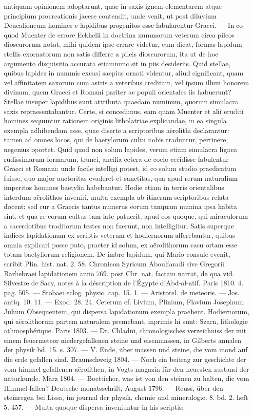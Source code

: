 \documentclass[a4paper, 11pt, oneside, polutonikogreek, german]{article}
\begin{document}
antiquam opinionem adoptarunt, quae in saxis ignem elementarem atque principium procreationis jacere contendit, unde venit, ut post diluvium Deucalioneum homines e lapidibus progenitos esse fabularentur Graeci. --- In eo quod Muenter de errore Eckhelii in doctrina nummorum veterum circa pileos dioscurorum notat, mihi quidem ipse errare videtur, eum dicat, formas lapidum stellis exornatorum non satis differre a pileis dioscurorum, ita ut de hoc argumento disquisitio accurata etiamnunc sit in piis desideriis. Quid stellae, quibus lapides in nummis excusi saepius ornati videntur, aliud significant, quam vel affinitatem saxorum cum astris a veteribus creditam, vel ipsum illum honorem divinum, quem Graeci et Romani pariter ac populi orientales iis habuerunt? Stellae insuper lapidibus sunt attributa quaedam numinum, quorum simulacra saxis repraesentabantur. Certe, si concedimus, eam quam Muenter et alii eruditi homines sequuntur rationem originis litholatriae explicandae, in ea singula exempla adhibendam esse, quae diserte a scriptoribus aërolithi declarantur: tamen ad omnes locos, qui de baetylorum cultu nobis traduntur, pertinere, negemus oportet. Quid quod non solum lapides, verum etiam simulacra lignea rudissimarum formarum, trunci, ancilia cetera de coelo cecidisse fabulentur Graeci et Romani: unde facile intelligi potest, id eo solum studio praedicatum fuisse, quo major auctoritas evaderet et sanctitas, qua apud rerum naturalium imperitos homines baetylia habebantur. Hodie etiam in terris orientalibus interdum aërolithos inveniri, multa exempla ab itinerum scriptoribus relata docent: sed cur a Graecis tantus numerus eorum tanquam numina ipsa habita sint, et qua re eorum cultus tam late patuerit, apud eos quoque, qui miraculorum a sacerdotibus traditorum testes non fuerunt, non intelligitur. Satis superque indices lapidationum ex scriptis veterum et hodiernorum afferebantur, quibus omnia explicari posse puto, praeter id solum, ex aërolithorum casu ortam esse totam baetyliorum religionem. De imbre lapidum, qui Mario consule evenit, scribit Plin. hist. nat. 2. 58. Chronicon Syricum Aboulfaradi sive Gregorii Barhebraei lapidationem anno 769. post Chr. nat. factam narrat, de qua vid. Silvestre de Sacy, notes à la déscription de l'Égypte d'Abd-al-atif. Paris 1810. 4. pag. 505. --- Stobaei eclog. physic. cap. 15. 1. --- Aristotel. de meteoris. --- Jos. antiq. 10. 11. --- Exod. 28. 24. Ceterum cf. Livium, Plinium, Flavium Josephum, Julium Obsequentem, qui dispersa lapidationum exempla praebent. Hodiernorum, qui aërolithorum partem naturalem premebant, inprimis hi sunt: Szarn, lithologie athmosphérique. Paris 1803. --- Dr. Chladni, chronologisches verzeichniss der mit einem feuermeteor niedergefallenen steine und eisenmassen, in Gilberts annalen der physik bd. 15. s. 307. --- V. Ende, über massen und steine, die vom mond auf die erde gefallen sind. Braunschweig 1804. --- Noch ein beitrag zur geschichte der vom himmel gefallenen aërolithen, in Vogts magazin für den neuesten zustand der naturkunde. März 1804. --- Boetticher, was ist von den steinen zu halten, die vom Himmel fallen? Deutsche monatsschrift, August 1796. --- Reuss, über den steinregen bei Lissa, im journal der physik, chemie und mineralogie. 8. bd. 2. heft 5. 457. --- Multa quoque dispersa inveniuntur in his scriptis: 
\end{document}
